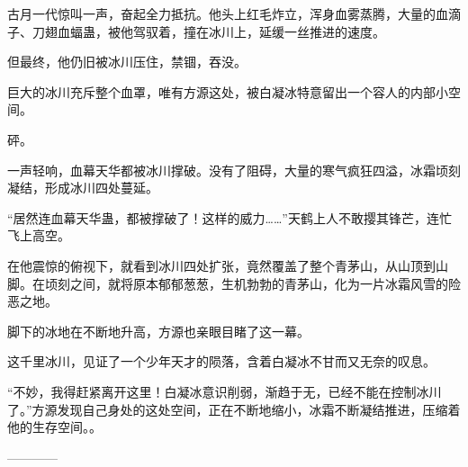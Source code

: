 \begin{this_body}
古月一代惊叫一声，奋起全力抵抗。他头上红毛炸立，浑身血雾蒸腾，大量的血滴子、刀翅血蝠蛊，被他驾驭着，撞在冰川上，延缓一丝推进的速度。

但最终，他仍旧被冰川压住，禁锢，吞没。

巨大的冰川充斥整个血罩，唯有方源这处，被白凝冰特意留出一个容人的内部小空间。

砰。

一声轻响，血幕天华都被冰川撑破。没有了阻碍，大量的寒气疯狂四溢，冰霜顷刻凝结，形成冰川四处蔓延。

“居然连血幕天华蛊，都被撑破了！这样的威力……”天鹤上人不敢撄其锋芒，连忙飞上高空。

在他震惊的俯视下，就看到冰川四处扩张，竟然覆盖了整个青茅山，从山顶到山脚。在顷刻之间，就将原本郁郁葱葱，生机勃勃的青茅山，化为一片冰霜风雪的险恶之地。

脚下的冰地在不断地升高，方源也亲眼目睹了这一幕。

这千里冰川，见证了一个少年天才的陨落，含着白凝冰不甘而又无奈的叹息。

“不妙，我得赶紧离开这里！白凝冰意识削弱，渐趋于无，已经不能在控制冰川了。”方源发现自己身处的这处空间，正在不断地缩小，冰霜不断凝结推进，压缩着他的生存空间。。

------------

\end{this_body}

